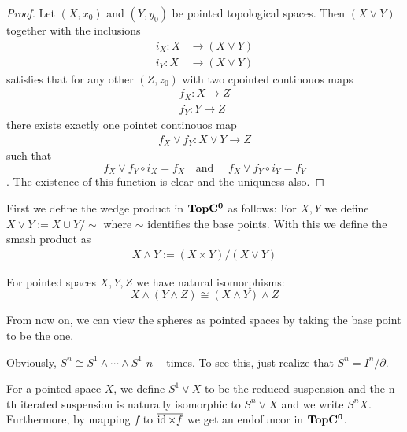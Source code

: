 \begin{proof}
	Let $(X,x_0)$ and $(Y,y_0)$ be pointed topological spaces. Then $(X\vee Y )$ together with the inclusions 
	\begin{align*}
		i_X: X &\to (X\vee Y)\\
		i_Y: X &\to (X\vee Y)
	\end{align*}
	 satisfies that for any other $(Z,z_0)$ with two cpointed continouos maps 
	 \begin{align*}
	 	f_X: X\to Z\\
	 	f_Y: Y\to Z
	 \end{align*} there exists exactly one pointet continouos map 
	 \begin{align*}
	 	f_X\vee f_Y: X\vee Y\to Z 
	 \end{align*} such that 
	 \begin{equation*}
	 	f_X\vee f_Y \circ i_X= f_X \quad \text{and }\quad f_X\vee f_Y \circ i_Y=f_Y
	 \end{equation*}. The existence of this function is clear and the uniquness also.
\end{proof}
\begin{definition}
	First we define the wedge product in $\operatorname{\mathbf{TopC^0}}$ as follows:
	For $X,Y$ we define $X \vee  Y:= X \cup Y \slash \sim$ where $\sim$ identifies the base points. With this we define the smash product as
	\begin{align*}
		X \wedge  Y := (X\times Y)\slash (X \vee Y )
	\end{align*}
\end{definition}
\begin{remark}
	For pointed spaces $X,Y,Z$ we have natural isomorphisms:
	\begin{equation*}
		X\wedge(Y\wedge Z) \cong (X\wedge Y)\wedge Z
	\end{equation*}
\end{remark}
From now on, we can view the spheres as pointed spaces by taking the base point to be the one. 
\begin{corollary}
	Obviously, $S^n\cong S^1\wedge \cdots \wedge S^1 $ $n-$times. To see this, just realize that $S^n=I^n\slash \partial$. 
\end{corollary}
\begin{definition}
	For a pointed space $X$, we define $S^1\vee X$ to be the reduced suspension and the n-th iterated suspension is naturally isomorphic to $S^n\vee X$ and we write $S^nX$. Furthermore, by mapping $f$ to $\overline{\operatorname{\mathrm{id}} \times f}$ we get an endofuncor in $\operatorname{\mathbf{TopC^0}}$.
\end{definition}

